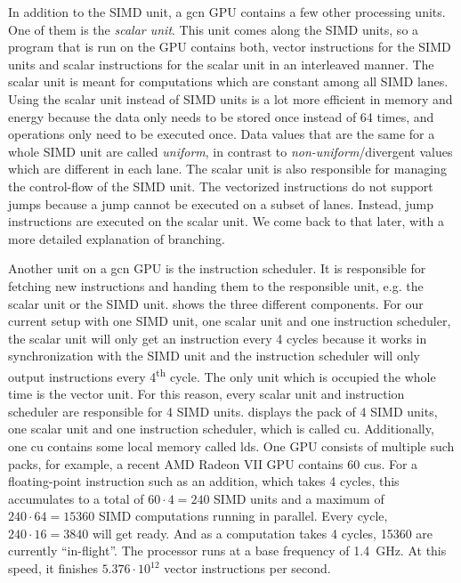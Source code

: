 In addition to the SIMD unit, a \gls{gcn} GPU contains a few other processing units. One of them is the \emph{scalar unit}. This unit comes along the SIMD units, so a program that is run on the GPU contains both, vector instructions for the SIMD units and scalar instructions for the scalar unit in an interleaved manner. The scalar unit is meant for computations which are constant among all SIMD lanes.
Using the scalar unit instead of SIMD units is a lot more efficient in memory and energy because the data only needs to be stored once instead of 64 times, and operations only need to be executed once.
Data values that are the same for a whole SIMD unit are called \emph{uniform}, in contrast to \emph{non-uniform}/divergent values which are different in each lane. The scalar unit is also responsible for managing the control-flow of the SIMD unit. The vectorized instructions do not support jumps because a jump cannot be executed on a subset of lanes. Instead, jump instructions are executed on the scalar unit. We come back to that later, with a more detailed explanation of branching.



Another unit on a \gls{gcn} GPU is the instruction scheduler. It is responsible for fetching new instructions and handing them to the responsible unit, e.g. the scalar unit or the SIMD unit.  shows the three different components. For our current setup with one SIMD unit, one scalar unit and one instruction scheduler, the scalar unit will only get an instruction every 4 cycles because it works in synchronization with the SIMD unit and the instruction scheduler will only output instructions every 4\textsuperscript{th} cycle. The only unit which is occupied the whole time is the vector unit. For this reason, every scalar unit and instruction scheduler are responsible for 4 SIMD units.  displays the pack of 4 SIMD units, one scalar unit and one instruction scheduler, which is called \gls{cu}. Additionally, one \gls{cu} contains some local memory called \gls{lds}. One GPU consists of multiple such packs, for example, a recent AMD Radeon VII GPU contains 60 \glspl{cu}. For a floating-point instruction such as an addition, which takes 4 cycles, this accumulates to a total of $60 \cdot 4 = 240$ SIMD units and a maximum of $240 \cdot 64 = 15360$ SIMD computations running in parallel. Every cycle, $240 \cdot 16 = 3840$ will get ready. And as a computation takes 4 cycles, 15360 are currently \enquote{in-flight}.
The processor runs at a base frequency of \SI{1.4}{\giga\hertz}. At this speed, it finishes $5.376 \cdot 10^{12}$ vector instructions per second.

